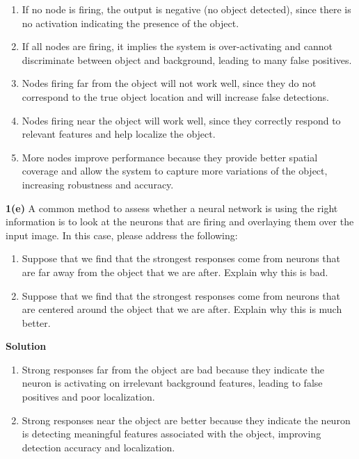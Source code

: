 \documentclass[11pt]{article}
\begin{document}
	\begin{enumerate}[label=\roman*.]
		
		\item If no node is firing, the output is negative (no object detected), since there is no activation indicating the presence of the object.
		
		\item If all nodes are firing, it implies the system is over-activating and cannot discriminate between object and background, leading to many false positives.
		
		\item Nodes firing far from the object will not work well, since they do not correspond to the true object location and will increase false detections.
		
		\item Nodes firing near the object will work well, since they correctly respond to relevant features and help localize the object.
		
		\item More nodes improve performance because they provide better spatial coverage and allow the system to capture more variations of the object, increasing robustness and accuracy.
		
	\end{enumerate}
	
	\textbf{1(e)} A common method to assess whether a neural network is using the right information is to look at the neurons
	that are firing and overlaying them over the input image. In this case, please address the following:
	
	\begin{enumerate}[label=\roman*.]
		\item Suppose that we find that the strongest responses come from neurons that are far away from the object that
		we are after. Explain why this is bad.
		\item Suppose that we find that the strongest responses come from neurons that are centered around the object that
		we are after. Explain why this is much better.
	\end{enumerate}
	
	\textbf{Solution}
	
	\begin{enumerate}[label=\roman*.]
		
		\item Strong responses far from the object are bad because they indicate the neuron is activating on irrelevant background features, leading to false positives and poor localization.
		
		\item Strong responses near the object are better because they indicate the neuron is detecting meaningful features associated with the object, improving detection accuracy and localization.
		
	\end{enumerate}
	
\end{document}
